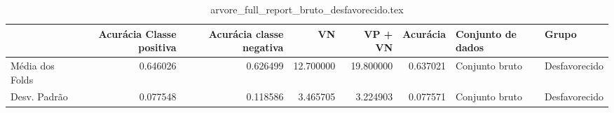 \begin{table}
\centering
\caption{arvore_full_report_bruto_desfavorecido.tex}
\label{arvore_full_report_bruto_desfavorecido.tex}
\begin{tabular}{lrrrrrll}
\toprule
{} &  Acurácia Classe positiva &  Acurácia classe negativa &        VN  &   VP + VN  &  Acurácia & Conjunto de dados &          Grupo \\
\midrule
Média dos Folds &                  0.646026 &                  0.626499 &  12.700000 &  19.800000 &  0.637021 &    Conjunto bruto &  Desfavorecido \\
Desv. Padrão    &                  0.077548 &                  0.118586 &   3.465705 &   3.224903 &  0.077571 &    Conjunto bruto &  Desfavorecido \\
\bottomrule
\end{tabular}
\end{table}
